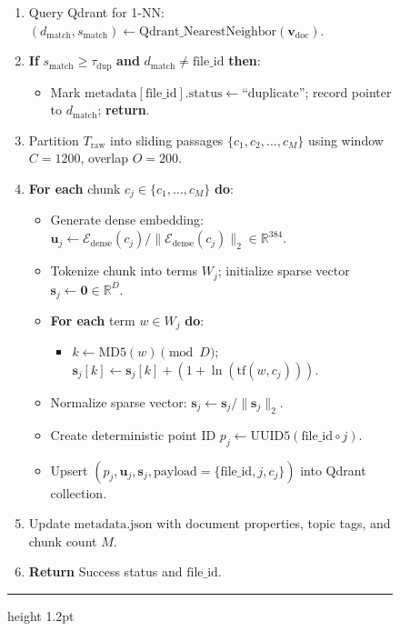 \documentclass[a4paper,12pt]{article}
\begin{document}
\begin{figure}[H]
\begin{minipage}{0.98\textwidth}
\begin{enumerate}
    \item Query Qdrant for 1-NN: $(d_{\text{match}}, s_{\text{match}}) \leftarrow \text{Qdrant\_NearestNeighbor}(\mathbf{v}_{\text{doc}})$.
    \item \textbf{If} $s_{\text{match}} \ge \tau_{\text{dup}}$ \textbf{and} $d_{\text{match}} \neq \text{file\_id}$ \textbf{then}:
    \begin{itemize}
        \item Mark $\text{metadata}[\text{file\_id}].\text{status} \leftarrow \text{``duplicate''}$; record pointer to $d_{\text{match}}$; \textbf{return}.
    \end{itemize}
    \item Partition $T_{\text{raw}}$ into sliding passages $\{c_1, c_2, \dots, c_M\}$ using window $C=1200$, overlap $O=200$.
    \item \textbf{For each} chunk $c_j \in \{c_1, \dots, c_M\}$ \textbf{do}:
    \begin{itemize}
        \item Generate dense embedding: $\mathbf{u}_j \leftarrow \mathcal{E}_{\text{dense}}(c_j) / \|\mathcal{E}_{\text{dense}}(c_j)\|_2 \in \mathbb{R}^{384}$.
        \item Tokenize chunk into terms $W_j$; initialize sparse vector $\mathbf{s}_j \leftarrow \mathbf{0} \in \mathbb{R}^D$.
        \item \textbf{For each} term $w \in W_j$ \textbf{do}:
        \begin{itemize}
            \item $k \leftarrow \text{MD5}(w) \pmod D$; \quad $\mathbf{s}_j[k] \leftarrow \mathbf{s}_j[k] + (1 + \ln(\text{tf}(w, c_j)))$.
        \end{itemize}
        \item Normalize sparse vector: $\mathbf{s}_j \leftarrow \mathbf{s}_j / \|\mathbf{s}_j\|_2$.
        \item Create deterministic point ID $p_j \leftarrow \text{UUID5}(\text{file\_id} \circ j)$.
        \item Upsert $(p_j, \mathbf{u}_j, \mathbf{s}_j, \text{payload}=\{\text{file\_id}, j, c_j\})$ into Qdrant collection.
    \end{itemize}
    \item Update $\text{metadata.json}$ with document properties, topic tags, and chunk count $M$.
    \item \textbf{Return} Success status and $\text{file\_id}$.
\end{enumerate}
\vspace{0.2em}
\hrule height 1.2pt
\end{minipage}
\label{alg:ingestion}
\end{figure}
\end{document}
